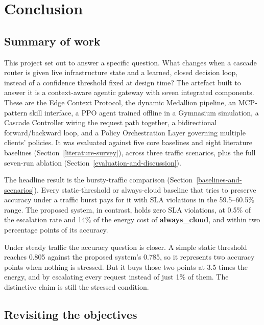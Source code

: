 \hypertarget{conclusion}{%
\section{Conclusion}\label{conclusion}}

\hypertarget{summary-of-work}{%
\subsection{Summary of work}\label{summary-of-work}}

This project set out to answer a specific question. What changes when a
cascade router is given live infrastructure state and a learned, closed
decision loop, instead of a confidence threshold fixed at design time?
The artefact built to answer it is a context-aware agentic gateway with
seven integrated components. These are the Edge Context Protocol, the
dynamic Medallion pipeline, an MCP-pattern skill interface, a PPO agent
trained offline in a Gymnasium simulation, a Cascade Controller wiring
the request path together, a bidirectional forward/backward loop, and a
Policy Orchestration Layer governing multiple clients' policies. It was
evaluated against five core baselines and eight literature baselines
(Section~\ref{literature-survey}), across three traffic scenarios, plus the full seven-run
ablation (Section~\ref{evaluation-and-discussion}).

The headline result is the bursty-traffic comparison (Section~\ref{baselines-and-scenarios}).
Every static-threshold or always-cloud baseline that tries to preserve
accuracy under a traffic burst pays for it with SLA violations in the
59.5--60.5\% range. The proposed system, in contrast, holds zero SLA
violations, at 0.5\% of the escalation rate and 14\% of the energy cost
of \textbf{always\_cloud}, and within two percentage points of its
accuracy.

Under steady traffic the accuracy question is closer. A simple static
threshold reaches 0.805 against the proposed system's 0.785, so it represents
two accuracy points when nothing is stressed. But it
buys those two points at 3.5 times the energy, and by escalating every
request instead of just 1\% of them. The distinctive claim is still the
stressed condition.

\hypertarget{revisiting-the-objectives}{%
\subsection{Revisiting the objectives}\label{revisiting-the-objectives}}


